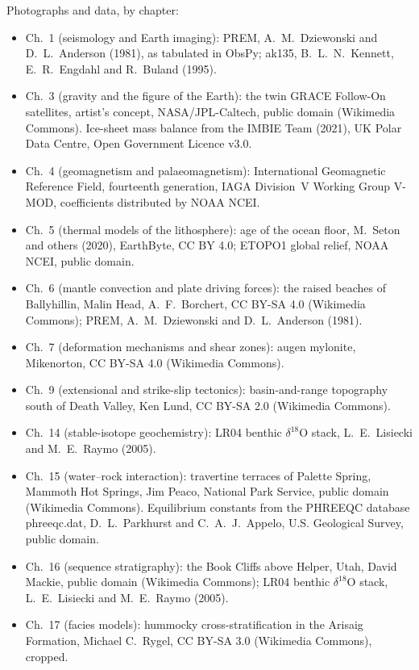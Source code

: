 \bigskip
\noindent Photographs and data, by chapter:
\begin{itemize}\small
  \item Ch.~1 (seismology and Earth imaging): PREM, A.~M.~Dziewonski and D.~L.~Anderson (1981), as tabulated in ObsPy; ak135, B.~L.~N.~Kennett, E.~R.~Engdahl and R.~Buland (1995).
  \item Ch.~3 (gravity and the figure of the Earth): the twin GRACE Follow-On satellites, artist's concept, NASA/JPL-Caltech, public domain (Wikimedia Commons). Ice-sheet mass balance from the IMBIE Team (2021), UK Polar Data Centre, Open Government Licence v3.0.
  \item Ch.~4 (geomagnetism and palaeomagnetism): International Geomagnetic Reference Field, fourteenth generation, IAGA Division~V Working Group V-MOD, coefficients distributed by NOAA NCEI.
  \item Ch.~5 (thermal models of the lithosphere): age of the ocean floor, M.~Seton and others (2020), EarthByte, CC BY 4.0; ETOPO1 global relief, NOAA NCEI, public domain.
  \item Ch.~6 (mantle convection and plate driving forces): the raised beaches of Ballyhillin, Malin Head, A.~F.~Borchert, CC BY-SA 4.0 (Wikimedia Commons); PREM, A.~M.~Dziewonski and D.~L.~Anderson (1981).
  \item Ch.~7 (deformation mechanisms and shear zones): augen mylonite, Mikenorton, CC BY-SA 4.0 (Wikimedia Commons).
  \item Ch.~9 (extensional and strike-slip tectonics): basin-and-range topography south of Death Valley, Ken Lund, CC BY-SA 2.0 (Wikimedia Commons).
  \item Ch.~14 (stable-isotope geochemistry): LR04 benthic $\delta^{18}$O stack, L.~E.~Lisiecki and M.~E.~Raymo (2005).
  \item Ch.~15 (water--rock interaction): travertine terraces of Palette Spring, Mammoth Hot Springs, Jim Peaco, National Park Service, public domain (Wikimedia Commons). Equilibrium constants from the PHREEQC database phreeqc.dat, D.~L.~Parkhurst and C.~A.~J.~Appelo, U.S. Geological Survey, public domain.
  \item Ch.~16 (sequence stratigraphy): the Book Cliffs above Helper, Utah, David Mackie, public domain (Wikimedia Commons); LR04 benthic $\delta^{18}$O stack, L.~E.~Lisiecki and M.~E.~Raymo (2005).
  \item Ch.~17 (facies models): hummocky cross-stratification in the Arisaig Formation, Michael C.~Rygel, CC BY-SA 3.0 (Wikimedia Commons), cropped.

\end{itemize}
